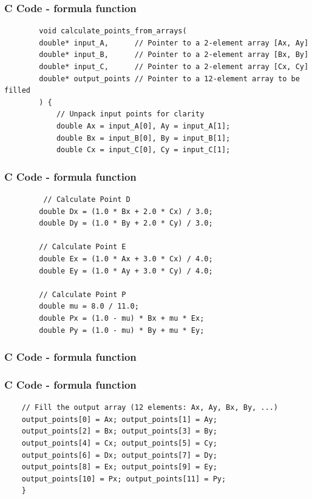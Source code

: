 \documentclass{beamer}
\begin{document}
	\begin{frame}[fragile]
		\frametitle{C Code -  formula function }
		
		\begin{lstlisting}
		void calculate_points_from_arrays(
		double* input_A,      // Pointer to a 2-element array [Ax, Ay]
		double* input_B,      // Pointer to a 2-element array [Bx, By]
		double* input_C,      // Pointer to a 2-element array [Cx, Cy]
		double* output_points // Pointer to a 12-element array to be filled
		) {
			// Unpack input points for clarity
			double Ax = input_A[0], Ay = input_A[1];
			double Bx = input_B[0], By = input_B[1];
			double Cx = input_C[0], Cy = input_C[1];
		\end{lstlisting}
	\end{frame}
	\begin{frame}[fragile]
		\frametitle{C Code -  formula function }
		
		\begin{lstlisting}
		 // Calculate Point D
		double Dx = (1.0 * Bx + 2.0 * Cx) / 3.0;
		double Dy = (1.0 * By + 2.0 * Cy) / 3.0;
		
		// Calculate Point E
		double Ex = (1.0 * Ax + 3.0 * Cx) / 4.0;
		double Ey = (1.0 * Ay + 3.0 * Cy) / 4.0;
		
		// Calculate Point P
		double mu = 8.0 / 11.0;
		double Px = (1.0 - mu) * Bx + mu * Ex;
		double Py = (1.0 - mu) * By + mu * Ey;
			\end{lstlisting}
		\end{frame}
	\frametitle{C Code -  formula function }
	\begin{frame}[fragile]
		\frametitle{C Code -  formula function }
	\begin{lstlisting}
	// Fill the output array (12 elements: Ax, Ay, Bx, By, ...)
	output_points[0] = Ax; output_points[1] = Ay;
	output_points[2] = Bx; output_points[3] = By;
	output_points[4] = Cx; output_points[5] = Cy;
	output_points[6] = Dx; output_points[7] = Dy;
	output_points[8] = Ex; output_points[9] = Ey;
	output_points[10] = Px; output_points[11] = Py;
	}
	\end{lstlisting}
	\end{frame}
	
\end{document}
